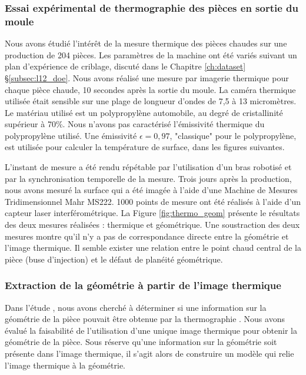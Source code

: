\subsubsection{Essai expérimental de thermographie des pièces en sortie du moule}
Nous avons étudié l'intérêt de la mesure thermique des pièces chaudes sur une production de 204 pièces.
Les paramètres de la machine ont été variés suivant un plan d'expérience de criblage, discuté dans le Chapitre \ref{ch:dataset} §\ref{subsec:l12_doe}.
Nous avons réalisé une mesure par imagerie thermique pour chaque pièce chaude, 10 secondes après la sortie du moule.
La caméra thermique utilisée était sensible sur une plage de longueur d'ondes de 7,5 à 13 micromètres.
Le matériau utilisé est un polypropylène automobile, au degré de cristallinité supérieur à 70\%.
Nous n'avons pas caractérisé l'émissivité thermique du polypropylène utilisé.
Une émissivité $\epsilon=0,97$, "classique" pour le polypropylène, est utilisée pour calculer la température de surface, dans les figures suivantes.

L'instant de mesure a été rendu répétable par l'utilisation d'un bras robotisé et par la synchronisation temporelle de la mesure.
Trois jours après la production, nous avons mesuré la surface qui a été imagée à l'aide d'une Machine de Mesures Tridimensionnel Mahr MS222.
1000 points de mesure ont été réalisés à l'aide d'un capteur laser interférométrique.
La Figure \ref{fig:thermo_geom} présente le résultats des deux mesures réalisées : thermique et géométrique.
Une soustraction des deux mesures montre qu'il n'y a pas de correspondance directe entre la géométrie et l'image thermique.
Il semble exister une relation entre le point chaud central de la pièce (buse d'injection) et le défaut de planéité géométrique.

\subsubsection{Extraction de la géométrie à partir de l'image thermique}
Dans l'étude , nous avons cherché à déterminer si une information sur la géométrie de la pièce pouvait être obtenue par la thermographie \cite{nagorny_generative_2018}.
Nous avons évalué la faisabilité de l'utilisation d'une unique image thermique pour obtenir la géométrie de la pièce.
Sous réserve qu'une information sur la géométrie soit présente dans l'image thermique, il s'agit alors de construire un modèle qui relie l'image thermique à la géométrie.


